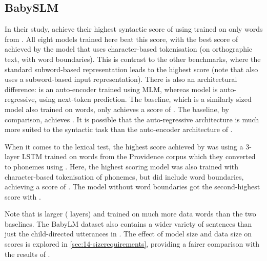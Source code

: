 \subsection{BabySLM}
\label{sec:14-babyslm}

In their study, \citet{lavechin} achieve their highest syntactic score of  using \babyberta \citep{huebner-etal-2021-babyberta} trained on only  words from \childes \citep{macwhinney1985child}. All eight \gpt models trained here beat this score, with the best score of  achieved by the model that uses character-based tokenisation (on orthographic text, with word boundaries). This is contrast to the other benchmarks, where the standard subword-based representation leads to the highest score (note that \babyberta also uses a subword-based input representation). There is also an architectural difference: \babyberta is an auto-encoder trained using MLM, whereas \gpt model is auto-regressive, using next-token prediction. The  baseline, which is a similarly sized model also trained on  words, only achieves a score of . The  baseline, by comparison, achieves . It is possible that the auto-regressive architecture is much more suited to the syntactic task than the auto-encoder architecture of \bert. 

When it comes to the lexical test, the highest score achieved by \citet{lavechin} was  using a 3-layer LSTM trained on  words from the Providence corpus \citep{borschinger-etal-2013-joint} which they converted to phonemes using \phonemizer. Here, the highest scoring model was also trained with character-based tokenisation of phonemes, but did include word boundaries, achieving a score of . The model without word boundaries got the second-highest score with .

Note that \gpt is larger ( layers) and trained on much more data  words than the two \babyslm baselines. The BabyLM dataset also contains a wider variety of sentences than just the child-directed utterances in \childes. The effect of model size and data size on \babyslm scores is explored in \cref{sec:14-sizerequirements}, providing a fairer comparison with the results of \citet{lavechin}.



